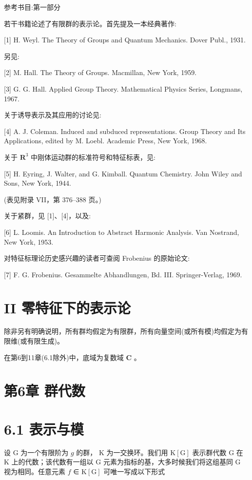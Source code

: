 \documentclass[10pt]{article}
\begin{document}
参考书目:第一部分

若干书籍论述了有限群的表示论。首先提及一本经典著作:

[1] H. Weyl. The Theory of Groups and Quantum Mechanics. Dover Publ., 1931.

另见:

[2] M. Hall. The Theory of Groups. Macmillan, New York, 1959.

[3] G. G. Hall. Applied Group Theory. Mathematical Physics Series, Longmans, 1967.

关于诱导表示及其应用的讨论见:

[4] A. J. Coleman. Induced and subduced representations. Group Theory and Its Applications, edited by M. Loebl. Academic Press, New York, 1968.

关于 \({\mathbf{R}}^{3}\) 中刚体运动群的标准符号和特征标表，见:

[5] H. Eyring, J. Walter, and G. Kimball. Quantum Chemistry. John Wiley and Sons, New York, 1944.

(表见附录 VII，第 376–388 页。)

关于紧群，见 [1]、[4]，以及:

[6] L. Loomis. An Introduction to Abstract Harmonic Analysis. Van Nostrand, New York, 1953.

对特征标理论历史感兴趣的读者可查阅 Frobenius 的原始论文:

[7] F. G. Frobenius. Gesammelte Abhandlungen, Bd. III. Springer-Verlag, 1969.

\section*{II 零特征下的表示论}

除非另有明确说明，所有群均假定为有限群，所有向量空间(或所有模)均假定为有限维(或有限生成)。

在第6到11章(6.1除外)中，底域为复数域 \(\mathbf{C}\) 。

\section*{第6章 群代数}

\section*{6.1 表示与模}

设 \(\mathrm{G}\) 为一个有限阶为 \(g\) 的群， \(\mathrm{K}\) 为一交换环。我们用 \(\mathrm{K}\left\lbrack  \mathrm{G}\right\rbrack\) 表示群代数 \(\mathrm{G}\) 在 \(\mathrm{K}\) 上的代数；该代数有一组以 \(\mathrm{G}\) 元素为指标的基，大多时候我们将这组基同 \(\mathrm{G}\) 视为相同。任意元素 \(f\) ∈ \(\mathrm{K}\left\lbrack  \mathrm{G}\right\rbrack\) 可唯一写成以下形式
\end{document}
